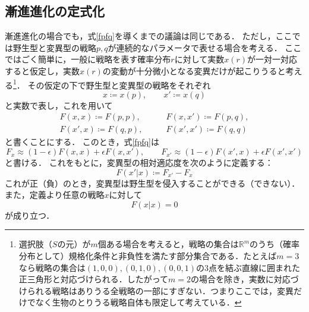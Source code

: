 \subsection{漸進進化の定式化}
漸進進化の場合でも，式\eqref{fpfq}を導くまでの議論は同じである．
ただし，ここでは野生型と変異型の戦略$p,q$が連続的なパラメータで表せる場合を考える．
ここではごく簡単に，一般に戦略を表す確率分布$r$に対して実数$x(r)$が一対一対応すると仮定し，実数$x(r)$の変動が十分微小となる変異だけが起こりうると考える\footnote{選択肢（$S$の元）が$m$個ある場合を考えると，戦略の集合は$\mathbb{R}^{m}$のうち（確率分布として）規格化条件と非負性を満たす部分集合である．たとえば$m=3$なら戦略の集合は$(1,0,0),(0,1,0),(0,0,1)$の3点を結ぶ直線に囲まれた正三角形と対応づけられる．したがって$m=2$の場合を除き，実数に対応づけられる戦略はありうる全戦略の一部にすぎない．つまりここでは，変異だけでなく生物のとりうる戦略自体も限定して考えている．}．
その仮定の下で野生型と変異型の戦略をそれぞれ
\begin{equation}
  x \coloneqq x(p),\qquad x' \coloneqq x(q)
\end{equation}
と実数で表し，これを用いて
\begin{align}
  F(x,x) \coloneqq F(p,p),\qquad &F(x,x') \coloneqq F(p,q), \\
  F(x',x) \coloneqq F(q,p),\qquad &F(x',x') \coloneqq F(q,q)
\end{align}
と書くことにする．
このとき，式\eqref{fpfq}は
\begin{equation}
  F_{x} \approx (1-\epsilon)F(x,x) + \epsilon F(x,x') ,\qquad F_{x'} \approx (1-\epsilon)F(x',x) + \epsilon F(x',x') 
\end{equation}
と書ける．
これをもとに，変異型の相対適応度を次のように定義する：
\begin{equation}
  F(x'|x) \coloneqq F_{x'} - F_{x}
\end{equation}
これが正（負）のとき，変異型は野生型を侵入することができる（できない）．
また，定義より任意の戦略$x$に対して
\begin{equation}
  F(x|x) = 0 \label{F0}
\end{equation}
が成り立つ．

